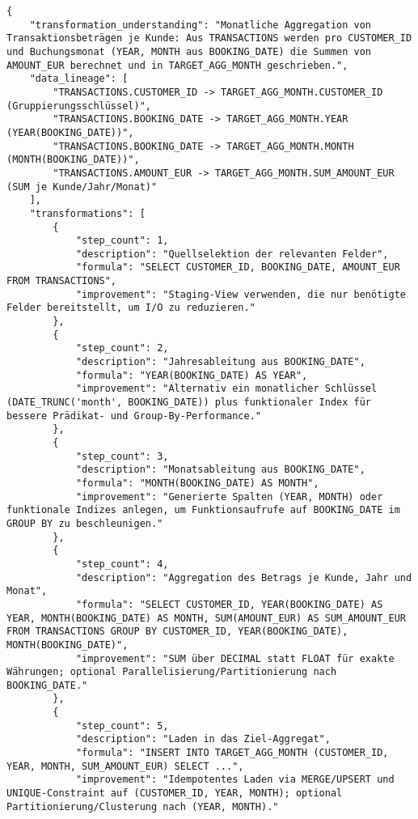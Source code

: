 \begin{lstlisting}[caption={Ausgabe: GPT-5 Anwendungsfall 1 Robustheitsdurchlauf},label={gpt_case1_prompt3}]
{
    "transformation_understanding": "Monatliche Aggregation von Transaktionsbeträgen je Kunde: Aus TRANSACTIONS werden pro CUSTOMER_ID und Buchungsmonat (YEAR, MONTH aus BOOKING_DATE) die Summen von AMOUNT_EUR berechnet und in TARGET_AGG_MONTH geschrieben.",
    "data_lineage": [
        "TRANSACTIONS.CUSTOMER_ID -> TARGET_AGG_MONTH.CUSTOMER_ID (Gruppierungsschlüssel)",
        "TRANSACTIONS.BOOKING_DATE -> TARGET_AGG_MONTH.YEAR (YEAR(BOOKING_DATE))",
        "TRANSACTIONS.BOOKING_DATE -> TARGET_AGG_MONTH.MONTH (MONTH(BOOKING_DATE))",
        "TRANSACTIONS.AMOUNT_EUR -> TARGET_AGG_MONTH.SUM_AMOUNT_EUR (SUM je Kunde/Jahr/Monat)"
    ],
    "transformations": [
        {
            "step_count": 1,
            "description": "Quellselektion der relevanten Felder",
            "formula": "SELECT CUSTOMER_ID, BOOKING_DATE, AMOUNT_EUR FROM TRANSACTIONS",
            "improvement": "Staging-View verwenden, die nur benötigte Felder bereitstellt, um I/O zu reduzieren."
        },
        {
            "step_count": 2,
            "description": "Jahresableitung aus BOOKING_DATE",
            "formula": "YEAR(BOOKING_DATE) AS YEAR",
            "improvement": "Alternativ ein monatlicher Schlüssel (DATE_TRUNC('month', BOOKING_DATE)) plus funktionaler Index für bessere Prädikat- und Group-By-Performance."
        },
        {
            "step_count": 3,
            "description": "Monatsableitung aus BOOKING_DATE",
            "formula": "MONTH(BOOKING_DATE) AS MONTH",
            "improvement": "Generierte Spalten (YEAR, MONTH) oder funktionale Indizes anlegen, um Funktionsaufrufe auf BOOKING_DATE im GROUP BY zu beschleunigen."
        },
        {
            "step_count": 4,
            "description": "Aggregation des Betrags je Kunde, Jahr und Monat",
            "formula": "SELECT CUSTOMER_ID, YEAR(BOOKING_DATE) AS YEAR, MONTH(BOOKING_DATE) AS MONTH, SUM(AMOUNT_EUR) AS SUM_AMOUNT_EUR FROM TRANSACTIONS GROUP BY CUSTOMER_ID, YEAR(BOOKING_DATE), MONTH(BOOKING_DATE)",
            "improvement": "SUM über DECIMAL statt FLOAT für exakte Währungen; optional Parallelisierung/Partitionierung nach BOOKING_DATE."
        },
        {
            "step_count": 5,
            "description": "Laden in das Ziel-Aggregat",
            "formula": "INSERT INTO TARGET_AGG_MONTH (CUSTOMER_ID, YEAR, MONTH, SUM_AMOUNT_EUR) SELECT ...",
            "improvement": "Idempotentes Laden via MERGE/UPSERT und UNIQUE-Constraint auf (CUSTOMER_ID, YEAR, MONTH); optional Partitionierung/Clusterung nach (YEAR, MONTH)."

\end{lstlisting}
